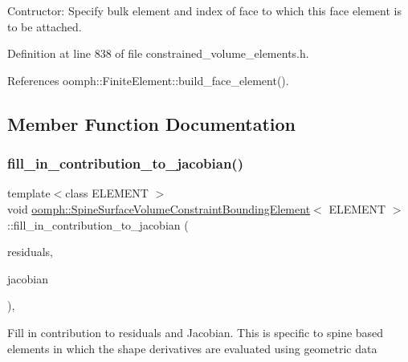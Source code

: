 Contructor\+: Specify bulk element and index of face to which this face element is to be attached. 



Definition at line 838 of file constrained\+\_\+volume\+\_\+elements.\+h.



References oomph\+::\+Finite\+Element\+::build\+\_\+face\+\_\+element().



\subsection{Member Function Documentation}
\mbox{\label{classoomph_1_1SpineSurfaceVolumeConstraintBoundingElement_a5eec2e025f24120c6f2a959da70bb5b1}} 
\subsubsection{\texorpdfstring{fill\+\_\+in\+\_\+contribution\+\_\+to\+\_\+jacobian()}{fill\_in\_contribution\_to\_jacobian()}}
{\footnotesize\ttfamily template$<$class E\+L\+E\+M\+E\+NT $>$ \\
void \hyperlink{classoomph_1_1SpineSurfaceVolumeConstraintBoundingElement}{oomph\+::\+Spine\+Surface\+Volume\+Constraint\+Bounding\+Element}$<$ E\+L\+E\+M\+E\+NT $>$\+::fill\+\_\+in\+\_\+contribution\+\_\+to\+\_\+jacobian (\begin{DoxyParamCaption}\item[{\hyperlink{classoomph_1_1Vector}{Vector}$<$ double $>$ \&}]{residuals,  }\item[{\hyperlink{classoomph_1_1DenseMatrix}{Dense\+Matrix}$<$ double $>$ \&}]{jacobian }\end{DoxyParamCaption})\hspace{0.3cm}{\ttfamily [inline]}, {\ttfamily [virtual]}}

Fill in contribution to residuals and Jacobian. This is specific to spine based elements in which the shape derivatives are evaluated using geometric data 

